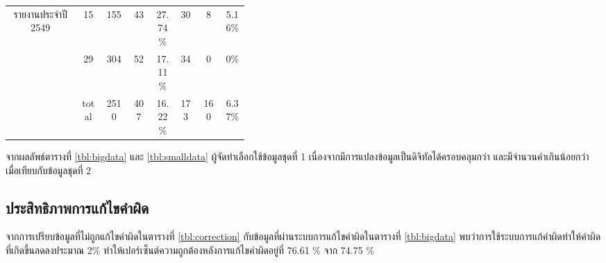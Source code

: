 \begin{table}[H]
\begin{tabular}{|c|c|c|p{0.1\linewidth}|p{0.1\linewidth}|c|p{0.1\linewidth}|p{0.1\linewidth}|}
        \multirow{2}{*}{รายงานประจำปี 2549}   & 15    & 155       & \multicolumn{1}{c|}{43 }         & \multicolumn{1}{c|}{27.74\%} & \multicolumn{1}{c|}{30 }    & \multicolumn{1}{c|}{8   }            & \multicolumn{1}{c|}{5.16\% } \\ \cline{2-8} 
                                            & 29    & 304       & \multicolumn{1}{c|}{52 }         & \multicolumn{1}{c|}{17.11\%} & \multicolumn{1}{c|}{34 }    & \multicolumn{1}{c|}{0   }            & \multicolumn{1}{c|}{0\%    } \\ \hline
                                            & total & 2510      & \multicolumn{1}{c|}{407}         & \multicolumn{1}{c|}{16.22\%} & \multicolumn{1}{c|}{173}    & \multicolumn{1}{c|}{160 }            & \multicolumn{1}{c|}{6.37\% } \\ \hline
        \end{tabular}
        \end{table}


จากผลลัพธ์ตารางที่ \ref{tbl:bigdata} และ \ref{tbl:smalldata} ผู้จัดทำเลือกใช้ข้อมูลชุดที่ 1 เนื่องจากมีการแปลงข้อมูลเป็นดิจิทัลได้ครอบคลุมกว่า และมีจำนวนคำเกินน้อยกว่า เมื่อเทียบกับข้อมูลชุดที่ 2

\subsection{ประสิทธิภาพการแก้ไขคำผิด}
จากการเปรียบข้อมูลที่ไม่ถูกแก้ไขคำผิดในตารางที่ \ref{tbl:correction} กับข้อมูลที่ผ่านระบบการแก้ไขคำผิดในตารางที่ \ref{tbl:bigdata}
พบว่าการใช้ระบบการแก้คำผิดทำให้คำผิดที่เกิดขึ้นลดลงประมาณ 2\% ทำให้เปอร์เซ็นต์ความถูกต้องหลังการแก้ไขคำผิดอยู่ที่ 76.61 \% จาก 74.75 \%

